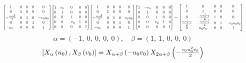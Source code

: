 \documentclass[11pt]{article}
\theoremstyle{definition}
\begin{document}
\[
\scaletoalign{\textwidth}{{\left[\begin{matrix}1 & 0 & 0 & 0 & 0\\0 & 1 & 0 & 0 & 0\\- \frac{c_{0} u_{0}^{2}}{2} & 0 & 1 & 0 & - c_{0} u_{0}\\0 & 0 & 0 & 1 & 0\\u_{0} & 0 & 0 & 0 & 1\end{matrix}\right]} {\left[\begin{matrix}1 & v_{0} & 0 & 0 & 0\\0 & 1 & 0 & 0 & 0\\0 & 0 & 1 & 0 & 0\\0 & 0 & - v_{0} & 1 & 0\\0 & 0 & 0 & 0 & 1\end{matrix}\right]} {\left[\begin{matrix}1 & 0 & 0 & 0 & 0\\0 & 1 & 0 & 0 & 0\\- \frac{c_{0} u_{0}^{2}}{2} & 0 & 1 & 0 & c_{0} u_{0}\\0 & 0 & 0 & 1 & 0\\- u_{0} & 0 & 0 & 0 & 1\end{matrix}\right]} {\left[\begin{matrix}1 & - v_{0} & 0 & 0 & 0\\0 & 1 & 0 & 0 & 0\\0 & 0 & 1 & 0 & 0\\0 & 0 & v_{0} & 1 & 0\\0 & 0 & 0 & 0 & 1\end{matrix}\right]} = {\left[\begin{matrix}1 & 0 & 0 & 0 & 0\\0 & 1 & 0 & 0 & 0\\0 & - \frac{c_{0} u_{0}^{2} v_{0}}{2} & 1 & 0 & 0\\\frac{c_{0} u_{0}^{2} v_{0}}{2} & - \frac{c_{0} u_{0}^{2} v_{0}^{2}}{2} & 0 & 1 & - c_{0} u_{0} v_{0}\\0 & u_{0} v_{0} & 0 & 0 & 1\end{matrix}\right]}}
\]
\[
\alpha = \left( -1, \  0, \  0, \  0, \  0\right), \quad \beta = \left( 1, \  1, \  0, \  0, \  0\right)
\]
\[
\scaletoalign{\textwidth}{\left[ X_{\alpha}\left(u_{0}\right), X_{\beta}\left(v_{0}\right) \right] = X_{\alpha + \beta}\left(- u_{0} v_{0}\right) X_{2\alpha + \beta}\left(- \frac{c_{0} u_{0}^{2} v_{0}}{2}\right)}
\]
\end{document}
